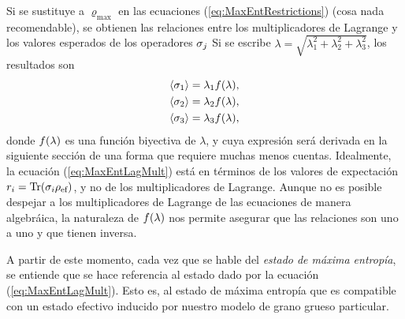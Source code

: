 Si se sustituye a $\varrho_{\max}$ en las ecuaciones (\ref{eq:MaxEntRestrictions}) (cosa nada recomendable), se obtienen las relaciones entre los multiplicadores de Lagrange y los valores esperados de los operadores $\sigma_{j}$ Si se escribe $\lambda=\sqrt{\lambda_{1}^{2}+\lambda_{2}^{2}+\lambda_{3}^{2}}$, los resultados son
\begin{align}\label{eq:MaxEntExpVals}
    \begin{split}
    \expval{\sigma_{1}}&=\lambda_{1}f(\lambda),\\
    \expval{\sigma_{2}}&=\lambda_{2}f(\lambda),\\
    \expval{\sigma_{3}}&=\lambda_{3}f(\lambda),
    \end{split}
\end{align}
donde $f(\lambda)$ es una función biyectiva de $\lambda$, y cuya expresión será derivada en la siguiente sección de una forma que requiere muchas menos cuentas. Idealmente, la ecuación (\ref{eq:MaxEntLagMult}) está en términos de los valores de expectación $r_{i}=\Tr(\sigma_{i}\rho_{\text{ef}})$, y no de los multiplicadores de Lagrange. Aunque no es posible despejar a los multiplicadores de Lagrange de las ecuaciones de manera algebráica, la naturaleza de $f(\lambda)$ nos permite asegurar que las relaciones son uno a uno y que tienen inversa.

A partir de este momento, cada vez que se hable del \textit{estado de máxima entropía}, se entiende que se hace referencia al estado dado por la ecuación (\ref{eq:MaxEntLagMult}). Esto es, al estado de máxima entropía que es compatible con un estado efectivo inducido por nuestro modelo de grano grueso particular.
